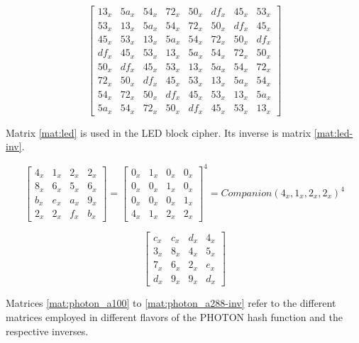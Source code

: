 \begin{equation}\label{mat:grostl-inv}
\begin{bmatrix}
13_x & 5a_x & 54_x & 72_x & 50_x & df_x & 45_x & 53_x\\
53_x & 13_x & 5a_x & 54_x & 72_x & 50_x & df_x & 45_x\\
45_x & 53_x & 13_x & 5a_x & 54_x & 72_x & 50_x & df_x\\
df_x & 45_x & 53_x & 13_x & 5a_x & 54_x & 72_x & 50_x\\
50_x & df_x & 45_x & 53_x & 13_x & 5a_x & 54_x & 72_x\\
72_x & 50_x & df_x & 45_x & 53_x & 13_x & 5a_x & 54_x\\
54_x & 72_x & 50_x & df_x & 45_x & 53_x & 13_x & 5a_x\\
5a_x & 54_x & 72_x & 50_x & df_x & 45_x & 53_x & 13_x
\end{bmatrix}
\end{equation}

Matrix \eqref{mat:led} is used in the LED block cipher. Its inverse is matrix \eqref{mat:led-inv}.

\begin{equation}\label{mat:led}
\begin{bmatrix}
  4_x & 1_x & 2_x & 2_x\\
  8_x & 6_x & 5_x & 6_x\\
  b_x & e_x & a_x & 9_x\\
  2_x & 2_x & f_x & b_x
\end{bmatrix}
=
\begin{bmatrix}
  0_x & 1_x & 0_x & 0_x\\
  0_x & 0_x & 1_x & 0_x\\
  0_x & 0_x & 0_x & 1_x\\
  4_x & 1_x & 2_x & 2_x
\end{bmatrix}^4
=
Companion(4_x,1_x,2_x,2_x)^4
\end{equation}

\begin{equation}\label{mat:led-inv}
  \begin{bmatrix}
  c_x & c_x & d_x & 4_x\\
  3_x & 8_x & 4_x & 5_x\\
  7_x & 6_x & 2_x & e_x\\
  d_x & 9_x & 9_x & d_x
  \end{bmatrix}
\end{equation}

Matrices \eqref{mat:photon_a100} to \eqref{mat:photon_a288-inv} refer to the different matrices employed in different flavors of the PHOTON hash function and the respective inverses.

